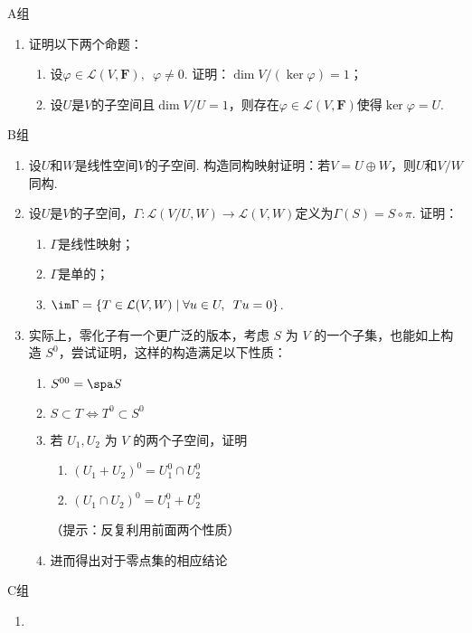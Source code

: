 \centerline{\heiti A组}
\begin{enumerate}
    \item 证明以下两个命题：
        \begin{enumerate}
            \item 设$\varphi\in \mathcal{L}(V,\mathbf{F}),\enspace\varphi\neq 0$. 证明：$\dim V/(\ker\varphi)=1$；

            \item 设$U$是$V$的子空间且$\dim V/U=1$，则存在$\varphi\in \mathcal{L}(V,\mathbf{F})$使得$\ker\varphi=U$.
        \end{enumerate}
\end{enumerate}

\centerline{\heiti B组}
\begin{enumerate}
    \item 设$U$和$W$是线性空间$V$的子空间. 构造同构映射证明：若$V=U\oplus W$，则$U$和$V/W$同构.

    \item 设$U$是$V$的子空间，$\Gamma:\mathcal{L}(V/U,W)\to \mathcal{L}(V,W)$定义为$\Gamma(S)=S\circ\pi$. 证明：
          \begin{enumerate}
              \item $\Gamma$是线性映射；

              \item $\Gamma$是单的；

              \item $\im\Gamma=\{T\in \mathcal{L}(V,W) \mid \forall u\in U,\enspace Tu=0\}$.
          \end{enumerate}

    \item 实际上，零化子有一个更广泛的版本，考虑 $S$ 为 $V$ 的一个子集，也能如上构造 $S^0$，尝试证明，这样的构造满足以下性质：
          \begin{enumerate}
              \item $S^{00} = \spa S$
              \item $S \subset T \iff T^0 \subset S^0$
              \item 若 $U_1, U_2$ 为 $V$ 的两个子空间，证明 \begin{enumerate}
                        \item $(U_1 + U_2)^0 = U_1^0 \cap U_2^0$
                        \item $(U_1 \cap U_2)^0 = U_1^0 + U_2^0$
                    \end{enumerate}（提示：反复利用前面两个性质）
              \item 进而得出对于零点集的相应结论
          \end{enumerate}
\end{enumerate}

\centerline{\heiti C组}
\begin{enumerate}
    \item
\end{enumerate}
